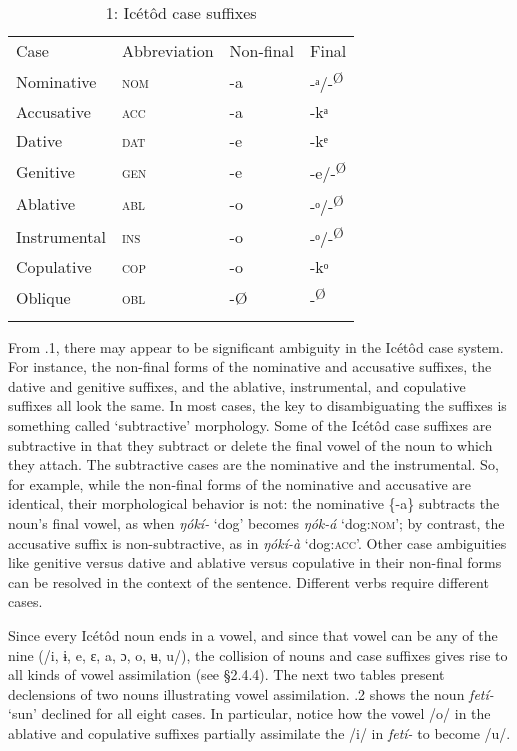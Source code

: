 \begin{table}
\caption{1: Icétôd case suffixes}
\label{tab:7}


\begin{tabularx}{\textwidth}{XXXX}
\lsptoprule

Case & Abbreviation & Non-final & Final\\
Nominative & \textsc{nom} & {}-a & {}-ᵃ/-\textsuperscript{Ø}\\
Accusative & \textsc{acc} & {}-a & {}-kᵃ\\
Dative & \textsc{dat} & {}-e & {}-kᵉ\\
Genitive & \textsc{gen} & {}-e & {}-e/-\textsuperscript{Ø}\\
Ablative & \textsc{abl} & {}-o & {}-ᵒ/-\textsuperscript{Ø}\\
Instrumental & \textsc{ins} & {}-o & {}-ᵒ/-\textsuperscript{Ø}\\
Copulative & \textsc{cop} & {}-o & {}-kᵒ\\
Oblique & \textsc{obl} & {}-Ø & {}-\textsuperscript{Ø}\\
\lspbottomrule
\end{tabularx}
\end{table}
From .1, there may appear to be significant ambiguity in the Icétôd case system. For instance, the non-final forms of the nominative and accusative suffixes, the dative and genitive suffixes, and the ablative, instrumental, and copulative suffixes all look the same. In most cases, the key to disambiguating the suffixes is something called ‘subtractive’\textsc{} morphology. Some of the Icétôd case suffixes are subtractive in that they subtract or delete the final vowel of the noun to which they attach. The subtractive cases are the nominative and the instrumental. So, for example, while the non-final forms of the nominative and accusative are identical, their morphological behavior is not: the nominative \{-a\} subtracts the noun’s final vowel, as when \textit{ŋókí-} ‘dog’ becomes \textit{ŋók-á} ‘dog:\textsc{nom}’; by contrast, the accusative suffix is non-subtractive, as in \textit{ŋókí-à} ‘dog:\textsc{acc}’. Other case ambiguities like genitive versus dative and ablative versus copulative in their non-final forms can be resolved in the context of the sentence. Different verbs require different cases.

Since every Icétôd noun ends in a vowel, and since that vowel can be any of the nine (/i, ɨ, e, ɛ, a, ɔ, o, ʉ, u/), the collision of nouns and case suffixes gives rise to all kinds of vowel assimilation (see §2.4.4). The next two tables present declensions of two nouns illustrating vowel assimilation. .2 shows the noun \textit{fetí-} ‘sun’ declined for all eight cases. In particular, notice how the vowel /o/ in the ablative and copulative suffixes partially assimilate the /i/ in \textit{fetí-} to become /u/. 


